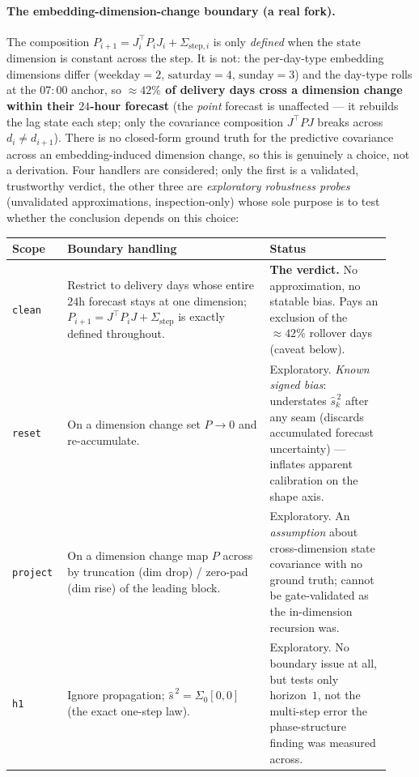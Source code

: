 \documentclass[11pt]{article}
\begin{document}
\paragraph{The embedding-dimension-change boundary (a real fork).}
The composition $P_{i+1}=J_i^{\!\top}P_iJ_i+\Sigma_{\text{step},i}$ is
only \emph{defined} when the state dimension is constant across the
step. It is not: the per-day-type embedding dimensions differ
($\text{weekday}=2$, $\text{saturday}=4$, $\text{sunday}=3$) and the
day-type rolls at the $07{:}00$ anchor, so \textbf{${\approx}42\%$ of
delivery days cross a dimension change within their $24$-hour forecast}
(the \emph{point} forecast is unaffected --- it rebuilds the lag state
each step; only the covariance composition $J^{\!\top}PJ$ breaks across
$d_i\neq d_{i+1}$). There is no closed-form ground truth for the
predictive covariance across an embedding-induced dimension change, so
this is genuinely a choice, not a derivation. Four handlers are
considered; only the first is a validated, trustworthy verdict, the
other three are \emph{exploratory robustness probes} (unvalidated
approximations, inspection-only) whose sole purpose is to test whether
the conclusion depends on this choice:

\begin{center}
\begin{tabular}{@{}p{0.13\linewidth}p{0.50\linewidth}p{0.30\linewidth}@{}}
\toprule
\textbf{Scope} & \textbf{Boundary handling} & \textbf{Status}\\
\midrule
\texttt{clean}
 & Restrict to delivery days whose entire $24$h forecast stays at one
   dimension; $P_{i+1}=J^{\!\top}P_iJ+\Sigma_{\text{step}}$ is exactly
   defined throughout.
 & \textbf{The verdict.} No approximation, no statable bias. Pays an
   exclusion of the ${\approx}42\%$ rollover days (caveat below). \\[10pt]
\texttt{reset}
 & On a dimension change set $P\!\to\!0$ and re-accumulate.
 & Exploratory. \emph{Known signed bias}: understates
   $\widehat{s}^{\,2}_k$ after any seam (discards accumulated forecast
   uncertainty) --- inflates apparent calibration on the shape axis. \\[10pt]
\texttt{project}
 & On a dimension change map $P$ across by truncation (dim drop) /
   zero-pad (dim rise) of the leading block.
 & Exploratory. An \emph{assumption} about cross-dimension state
   covariance with no ground truth; cannot be gate-validated as the
   in-dimension recursion was. \\[10pt]
\texttt{h1}
 & Ignore propagation; $\widehat{s}^{\,2}=\Sigma_0[0,0]$ (the exact
   one-step law).
 & Exploratory. No boundary issue at all, but tests only horizon~$1$,
   not the multi-step error the phase-structure finding was measured
   across. \\
\bottomrule
\end{tabular}
\end{center}
\end{document}
